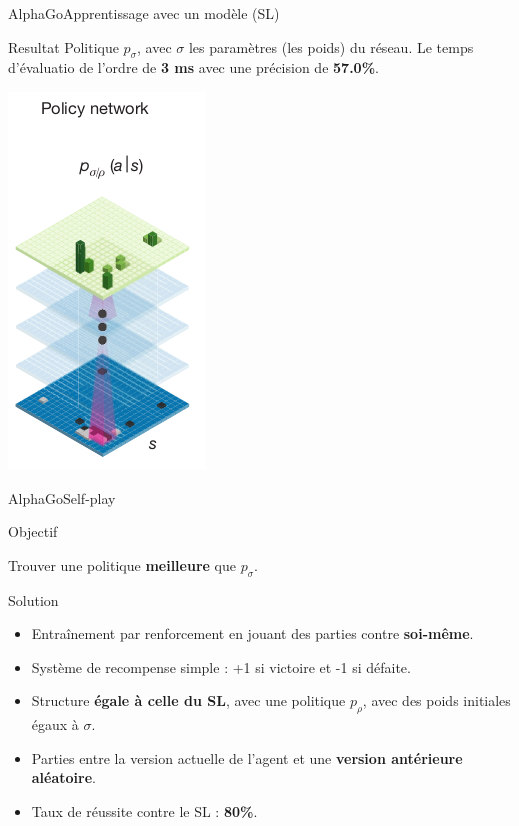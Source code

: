 \begin{frame}{AlphaGo}{Apprentissage avec un modèle (SL)}
    \begin{block}{Resultat}
        Politique $p_\sigma$, avec $\sigma$ les paramètres (les poids) du réseau.
        Le temps d'évaluatio de l'ordre de \textbf{3 ms} avec une précision de \textbf{57.0\%}.
    \end{block}
    \begin{center}
        \includegraphics[scale=0.4]{ressources/AlphaGo/Policy_Network}
    \end{center}
\end{frame}

\begin{frame}{AlphaGo}{Self-play}
    \begin{block}{Objectif}
        \begin{center}
            Trouver une politique \textbf{meilleure} que $p_\sigma$.
        \end{center}
    \end{block}

    \begin{block}{Solution}
        \begin{itemize}
            \item Entraînement par renforcement en jouant des parties contre \textbf{soi-même}.
            \item Système de recompense simple : +1 si victoire et -1 si défaite.
            \item Structure \textbf{égale à celle du SL}, avec une politique $p_\rho$, avec des poids initiales égaux à $\sigma$.
            \item Parties entre la version actuelle de l'agent et une \textbf{version antérieure aléatoire}.
            \item Taux de réussite contre le SL : \textbf{80\%}.
        \end{itemize}
    \end{block}
\end{frame}


